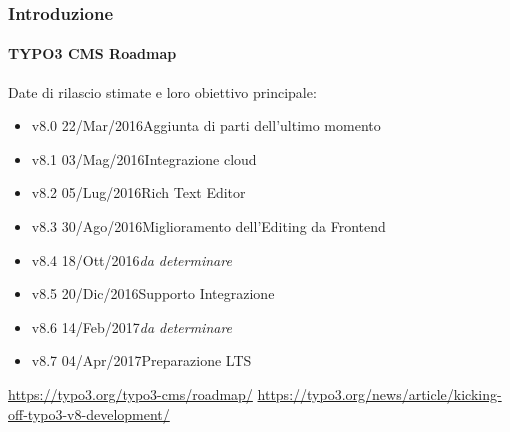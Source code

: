 \begin{frame}[fragile]
	\frametitle{Introduzione}
	\framesubtitle{TYPO3 CMS Roadmap}

	Date di rilascio stimate e loro obiettivo principale:

	\begin{itemize}

		\item v8.0 \tabto{1.1cm}22/Mar/2016\tabto{3.4cm}Aggiunta di parti dell'ultimo momento
		\item
			\begingroup
				\color{typo3orange}
					v8.1 \tabto{1.1cm}03/Mag/2016\tabto{3.4cm}Integrazione cloud
			\endgroup
		\item v8.2 \tabto{1.1cm}05/Lug/2016\tabto{3.4cm}Rich Text Editor
		\item v8.3 \tabto{1.1cm}30/Ago/2016\tabto{3.4cm}Miglioramento dell'Editing da Frontend
		\item v8.4 \tabto{1.1cm}18/Ott/2016\tabto{3.4cm}\textit{da determinare}
		\item v8.5 \tabto{1.1cm}20/Dic/2016\tabto{3.4cm}Supporto Integrazione
		\item v8.6 \tabto{1.1cm}14/Feb/2017\tabto{3.4cm}\textit{da determinare}
		\item v8.7 \tabto{1.1cm}04/Apr/2017\tabto{3.4cm}Preparazione LTS

	\end{itemize}

	\smaller
		\url{https://typo3.org/typo3-cms/roadmap/}\newline
		\url{https://typo3.org/news/article/kicking-off-typo3-v8-development/}
	\normalsize

\end{frame}


